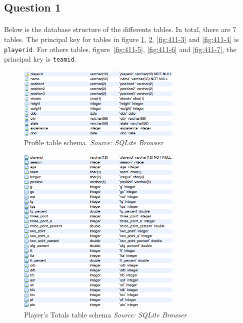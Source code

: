 
\subsection{Question 1}
\label{subsec:411}

\paragraph{}Below is the database structure of the differents tables. In total, there are 7 tables. The principal key for tables in figure \ref{fig:411-1}, \ref{fig:411-2}, \ref{fig:411-3} and \ref{fig:411-4} is \texttt{playerid}. For others tables, figure~\ref{fig:411-5}, \ref{fig:411-6} and \ref{fig:411-7}, the principal key is \texttt{teamid}.

\begin{figure}[h!]
	\begin{center}
		\includegraphics[width=0.7\textwidth]{./images/profile}
		\caption{Profile table schema. \textit{Source: SQLite Browser}}
		\label{fig:411-1}
	\end{center}
\end{figure}

\begin{figure}[h!]
	\begin{center}
		\includegraphics[width=0.7\textwidth]{./images/player_total}
		\caption{Player's Totals table schema \textit{Source: SQLite Browser}}
		\label{fig:411-2}
	\end{center}
\end{figure}

